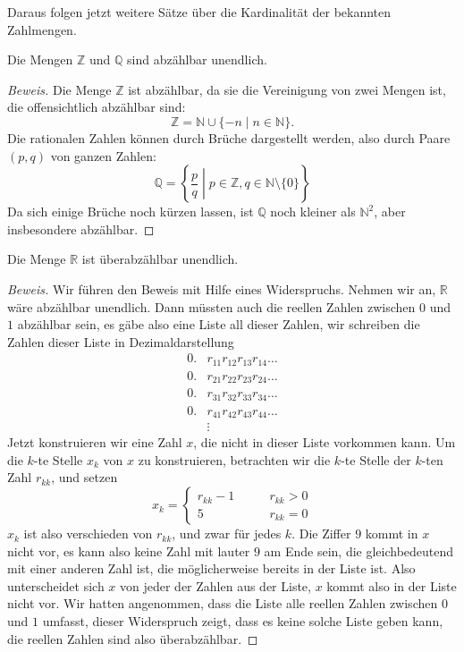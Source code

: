 Daraus folgen jetzt weitere Sätze über die Kardinalität
der bekannten Zahlmengen.

\begin{satz}
Die Mengen $\mathbb Z$ und $\mathbb Q$ sind abzählbar unendlich.
\end{satz}

\begin{proof}[Beweis]
Die Menge $\mathbb Z$ ist abzählbar, da sie die Vereinigung
von zwei Mengen ist, die offensichtlich abzählbar sind:
\[
\mathbb Z = \mathbb N\cup \{-n\;|\;n\in\mathbb N\}.
\]
Die rationalen Zahlen können durch Brüche dargestellt werden,
also durch Paare $(p,q)$ von ganzen Zahlen:
\[
\mathbb Q=\left\{\left.\frac{p}{q}\;\right|\;p\in \mathbb Z,q\in\mathbb N\setminus\{0\}\right\}
\]
Da sich einige Brüche noch kürzen lassen, ist $\mathbb Q$ noch
kleiner als $\mathbb N^2$, aber insbesondere abzählbar.
\end{proof}

\begin{satz}
Die Menge $\mathbb R$ ist überabzählbar unendlich.
\end{satz}

\begin{proof}[Beweis]
Wir führen den Beweis mit Hilfe eines Widerspruchs. Nehmen wir
an, $\mathbb R$ wäre abzählbar unendlich. Dann müssten auch
die reellen Zahlen zwischen $0$ und $1$ abzählbar sein,  es gäbe also eine
Liste all dieser Zahlen, wir schreiben die Zahlen
dieser Liste in Dezimaldarstellung
\begin{align*}
0.&r_{11}r_{12}r_{13}r_{14}\dots\\
0.&r_{21}r_{22}r_{23}r_{24}\dots\\
0.&r_{31}r_{32}r_{33}r_{34}\dots\\
0.&r_{41}r_{42}r_{43}r_{44}\dots\\
&\vdots
\end{align*}
Jetzt konstruieren wir eine Zahl $x$, die nicht in dieser Liste vorkommen
kann. Um die $k$-te Stelle $x_k$ von $x$ zu konstruieren, betrachten
wir die $k$-te Stelle der $k$-ten Zahl $r_{kk}$, und setzen
\[
x_k=\begin{cases}
r_{kk}-1&\qquad r_{kk}>0\\
5&\qquad r_{kk}=0
\end{cases}
\]
$x_k$ ist also verschieden von $r_{kk}$, und zwar für jedes $k$.
Die Ziffer $9$ kommt in $x$ nicht vor, es kann also keine Zahl
mit lauter $9$ am Ende sein, die gleichbedeutend mit einer anderen
Zahl ist, die möglicherweise bereits in der Liste ist.
Also unterscheidet sich $x$ von jeder der Zahlen aus der Liste, $x$
kommt also in der Liste nicht vor. Wir hatten angenommen, dass die
Liste alle reellen Zahlen zwischen $0$ und $1$ umfasst, dieser
Widerspruch zeigt, dass es keine solche Liste geben kann, die
reellen Zahlen sind also überabzählbar.
\end{proof}

